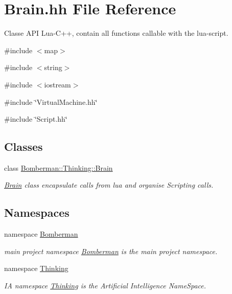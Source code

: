 \hypertarget{Brain_8hh}{
\section{Brain.hh File Reference}
\label{Brain_8hh}
}


Classe API Lua-\/C++, contain all functions callable with the lua-\/script.  


{\ttfamily \#include $<$map$>$}\par
{\ttfamily \#include $<$string$>$}\par
{\ttfamily \#include $<$iostream$>$}\par
{\ttfamily \#include \char`\"{}VirtualMachine.hh\char`\"{}}\par
{\ttfamily \#include \char`\"{}Script.hh\char`\"{}}\par
\subsection*{Classes}
\begin{DoxyCompactItemize}
\item 
class \hyperlink{classBomberman_1_1Thinking_1_1Brain}{Bomberman::Thinking::Brain}
\begin{DoxyCompactList}\small\item\em \hyperlink{classBomberman_1_1Thinking_1_1Brain}{Brain} class encapsulate calls from lua and organise Scripting calls. \end{DoxyCompactList}\end{DoxyCompactItemize}
\subsection*{Namespaces}
\begin{DoxyCompactItemize}
\item 
namespace \hyperlink{namespaceBomberman}{Bomberman}


\begin{DoxyCompactList}\small\item\em main project namespace \hyperlink{namespaceBomberman}{Bomberman} is the main project namespace. \end{DoxyCompactList}

\item 
namespace \hyperlink{namespaceThinking}{Thinking}


\begin{DoxyCompactList}\small\item\em IA namespace \hyperlink{namespaceThinking}{Thinking} is the Artificial Intelligence NameSpace. \end{DoxyCompactList}

\end{DoxyCompactItemize}


